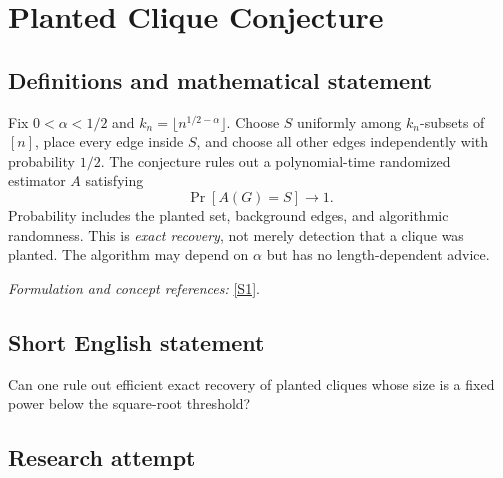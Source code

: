 \documentclass[11pt,a4paper]{article}
\newcommand{\sref}[2]{\hyperlink{source:#1:#2}{[S#2]}}
\newif\ifshowcatalogue
\newcommand{\cataloguescope}[1]{\ifshowcatalogue
 \paragraph{Exact scope in the supplied catalogue.}
 \begin{quote}\small #1\end{quote}\fi}
\numberwithin{equation}{section}
\begin{document}
\setcounter{section}{131}
\clearpage
\section{\texorpdfstring{Planted Clique Conjecture}{Planted Clique Conjecture}}\label{132}
\subsection{Definitions and mathematical statement}
Fix $0<\alpha<1/2$ and $k_n=\lfloor n^{1/2-\alpha}\rfloor$. Choose $S$ uniformly among $k_n$-subsets of $[n]$, place every edge inside $S$, and choose all other edges independently with probability $1/2$. The conjecture rules out a polynomial-time randomized estimator $A$ satisfying
\[
 \Pr[A(G)=S]\longrightarrow1.
\]
Probability includes the planted set, background edges, and algorithmic randomness. This is \emph{exact recovery}, not merely detection that a clique was planted. The algorithm may depend on $\alpha$ but has no length-dependent advice.
\par\smallskip\textit{Formulation and concept references:} \sref{132}{1}.
\cataloguescope{For every fixed real alpha with 0<alpha<1/2, set k\_n=floor(n\textasciicircum{}(1/2-alpha)). Sample a uniform k\_n-subset S of n labeled vertices, put every edge inside S, and independently include each other edge with probability1/2. There is no randomized algorithm running in time polynomial in n that, given this graph, outputs exactly S with probability tending to1 as n tends to infinity, over S, remaining edges and its internal coins. Algorithms may depend on the fixed alpha but receive no advice depending on n.}
\subsection{Short English statement}
Can one rule out efficient exact recovery of planted cliques whose size is a fixed power below the square-root threshold?
\subsection{Research attempt}
\end{document}
